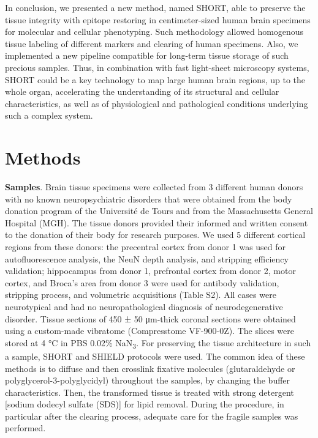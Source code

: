 \documentclass{article}
\begin{document}
In conclusion, we presented a new method, named SHORT, able to preserve the tissue integrity with epitope restoring in centimeter-sized human brain specimens for molecular and cellular phenotyping. Such methodology allowed homogenous tissue labeling of different markers and clearing of human specimens. Also, we implemented a new pipeline compatible for long-term tissue storage of such precious samples. Thus, in combination with fast light-sheet microscopy systems, SHORT could be a key technology to map large human brain regions, up to the whole organ, accelerating the understanding of its structural and cellular characteristics, as well as of physiological and pathological conditions underlying such a complex system.

\section*{Methods}

\textbf{Samples}. Brain tissue specimens were collected from 3 different human donors with no known neuropsychiatric disorders that were obtained from the body donation program of the Université de Tours and from the Massachusetts General Hospital (MGH). The tissue donors provided their informed and written consent to the donation of their body for research purposes. We used 5 different cortical regions from these donors: the precentral cortex from donor 1 was used for autofluorescence analysis, the NeuN depth analysis, and stripping efficiency validation; hippocampus from donor 1, prefrontal cortex from donor 2, motor cortex, and Broca’s area from donor 3 were used for antibody validation, stripping process, and volumetric acquisitions (Table S2). All cases were neurotypical and had no neuropathological diagnosis of neurodegenerative disorder. Tissue sections of 450 ± 50 μm-thick coronal sections were obtained using a custom-made vibratome (Compresstome VF-900-0Z). The slices were stored at 4 °C in PBS 0.02\% NaN\textsubscript{3}. For preserving the tissue architecture in such a sample, SHORT and SHIELD protocols were used. The common idea of these methods is to diffuse and then crosslink fixative molecules (glutaraldehyde or polyglycerol-3-polyglycidyl) throughout the samples, by changing the buffer characteristics. Then, the transformed tissue is treated with strong detergent [sodium dodecyl sulfate (SDS)] for lipid removal. During the procedure, in particular after the clearing process, adequate care for the fragile samples was performed.
\end{document}
